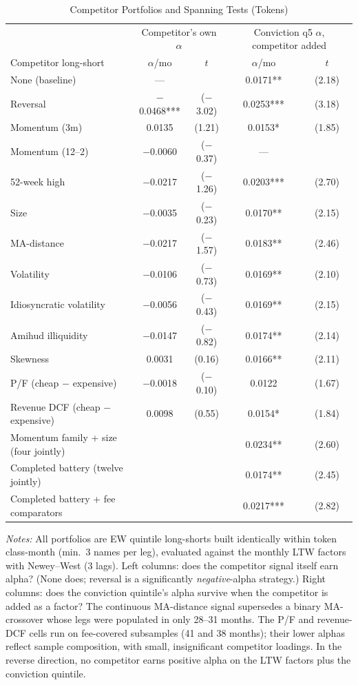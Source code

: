 \documentclass[12pt]{article}
\begin{document}
\begin{table}[ht]
\centering
\caption{Competitor Portfolios and Spanning Tests (Tokens)}
\label{tab:spanning}
\small
\begin{tabular}{lcccc}
\toprule
 & \multicolumn{2}{c}{Competitor's own $\alpha$} & \multicolumn{2}{c}{Conviction q5 $\alpha$, competitor added} \\
Competitor long-short & $\alpha$/mo & $t$ & $\alpha$/mo & $t$ \\
\midrule
None (baseline) & --- & & 0.0171** & (2.18) \\
Reversal & $-$0.0468*** & ($-$3.02) & 0.0253*** & (3.18) \\
Momentum (3m) & 0.0135 & (1.21) & 0.0153* & (1.85) \\
Momentum (12--2) & $-$0.0060 & ($-$0.37) & --- & \\
52-week high & $-$0.0217 & ($-$1.26) & 0.0203*** & (2.70) \\
Size & $-$0.0035 & ($-$0.23) & 0.0170** & (2.15) \\
MA-distance & $-$0.0217 & ($-$1.57) & 0.0183** & (2.46) \\
Volatility & $-$0.0106 & ($-$0.73) & 0.0169** & (2.10) \\
Idiosyncratic volatility & $-$0.0056 & ($-$0.43) & 0.0169** & (2.15) \\
Amihud illiquidity & $-$0.0147 & ($-$0.82) & 0.0174** & (2.14) \\
Skewness & 0.0031 & (0.16) & 0.0166** & (2.11) \\
P/F (cheap $-$ expensive) & $-$0.0018 & ($-$0.10) & 0.0122 & (1.67) \\
Revenue DCF (cheap $-$ expensive) & 0.0098 & (0.55) & 0.0154* & (1.84) \\
\midrule
Momentum family + size (four jointly) & & & 0.0234** & (2.60) \\
Completed battery (twelve jointly) & & & 0.0174** & (2.45) \\
Completed battery + fee comparators & & & 0.0217*** & (2.82) \\
\bottomrule
\end{tabular}
\smallskip

\parbox{0.92\linewidth}{\footnotesize
\textit{Notes:} All portfolios are EW quintile long-shorts built identically within
token class-month (min.\ 3 names per leg), evaluated against the monthly LTW factors
with Newey--West (3 lags). Left columns: does the competitor signal itself earn alpha?
(None does; reversal is a significantly \textit{negative}-alpha strategy.) Right
columns: does the conviction quintile's alpha survive when the competitor is added as a
factor? The continuous MA-distance signal supersedes a binary MA-crossover whose legs
were populated in only 28--31 months. The P/F and revenue-DCF cells run on fee-covered
subsamples (41 and 38 months); their lower alphas reflect sample composition, with
small, insignificant competitor loadings. In the reverse direction, no competitor earns
positive alpha on the LTW factors plus the conviction quintile.}
\end{table}
\end{document}
